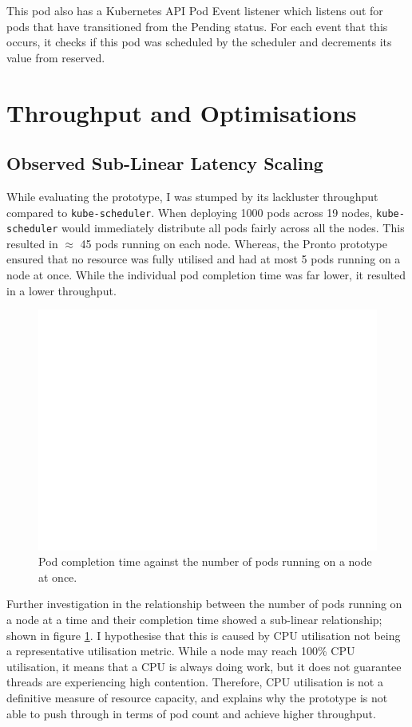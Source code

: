 This pod also has a Kubernetes API Pod Event listener which listens out for pods
that have transitioned from the Pending status. For each event that this occurs,
it checks if this pod was scheduled by the scheduler and decrements its value
from reserved.

\section{Throughput and Optimisations}

\subsection{Observed Sub-Linear Latency Scaling}
While evaluating the prototype, I was stumped by its lackluster throughput
compared to \verb|kube-scheduler|. When deploying 1000 pods across 19 nodes,
\verb|kube-scheduler| would immediately distribute all pods fairly across all
the nodes. This resulted in $\approx$ 45 pods running on each node. Whereas, the
Pronto prototype ensured that no resource was fully utilised and had at most 5
pods running on a node at once. While the individual pod completion time was far
lower, it resulted in a lower throughput.

\begin{figure}[h]
    \centering
    \includegraphics[width=\textwidth]{images/blank.pdf}
    \caption{Pod completion time against the number of pods running on a node at
    once.}
    \label{fig:number-vs-completion}
\end{figure}

Further investigation in the relationship between the number of pods running on
a node at a time and their completion time showed a sub-linear relationship;
shown in figure \ref{fig:number-vs-completion}. I hypothesise that this is
caused by CPU utilisation not being a representative utilisation metric. While a
node may reach 100\% CPU utilisation, it means that a CPU is always doing work,
but it does not guarantee threads are experiencing high contention. Therefore,
CPU utilisation is not a definitive measure of resource capacity, and explains
why the prototype is not able to push through in terms of pod count and achieve
higher throughput.

